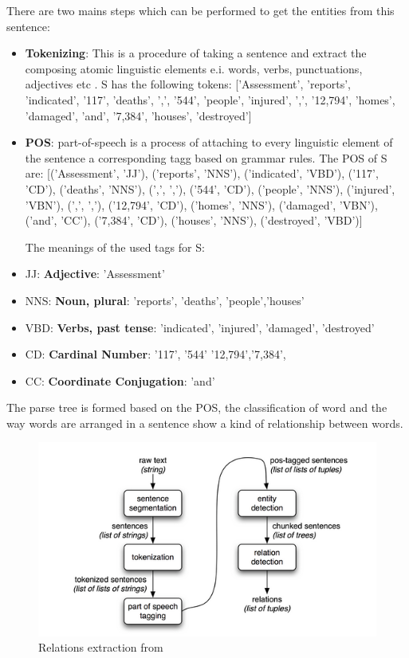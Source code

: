 There are two mains steps which can be performed to get the entities from  this sentence:
\begin{itemize}
\item \textbf{Tokenizing}: This is a procedure of taking a sentence and extract the composing atomic linguistic elements e.i. words, verbs, punctuations, adjectives etc .
S has the following tokens: ['Assessment', 'reports', 'indicated', '117', 'deaths', ',', '544', 'people', 'injured', ',', '12,794', 'homes', 'damaged', 'and', '7,384', 'houses', 'destroyed']
\item \textbf{POS}: part-of-speech is a process of attaching to every linguistic element of the sentence a corresponding tagg based on grammar rules.
The POS of S  are: 
[('Assessment', 'JJ'), ('reports', 'NNS'), ('indicated', 'VBD'), ('117', 'CD'), ('deaths', 'NNS'), (',', ','), ('544', 'CD'), ('people', 'NNS'), ('injured', 'VBN'), (',', ','), ('12,794', 'CD'), ('homes', 'NNS'), ('damaged', 'VBN'), ('and', 'CC'), ('7,384', 'CD'), ('houses', 'NNS'), ('destroyed', 'VBD')]

The meanings of the used tags for S:
\end{itemize}
\begin{itemize}
\item JJ: \textbf{Adjective}: 'Assessment'   
\item NNS: \textbf{Noun, plural}: 'reports', 'deaths', 'people','houses'
\item VBD: \textbf{Verbs, past tense}: 'indicated',             'injured', 'damaged', 'destroyed'
\item CD: \textbf{Cardinal Number}: '117', '544' '12,794','7,384',
\item CC: \textbf{Coordinate Conjugation}: 'and'
\end{itemize}
The parse tree is formed based on the POS, the classification of word and the way words are arranged in a sentence show a kind of relationship between words.
\begin{figure}[hbtp]
\caption{Relations extraction from }
\centering
\includegraphics[scale=0.7]{images/nltk.png}
\end{figure}



